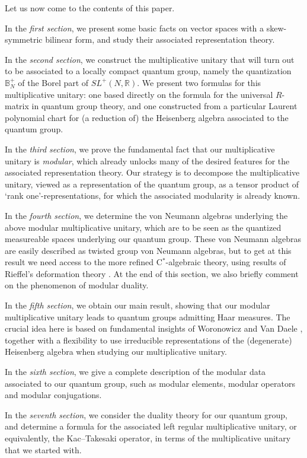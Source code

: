 \documentclass[11pt, reqno]{amsart}
\theoremstyle{definition}
\numberwithin{equation}{section}
\def\R{\mathbb R}
\newcommand{\Bbbb}{\mathbb{B}}
\begin{document}
Let us now come to the contents of this paper. 

In the \emph{first section}, we present some basic facts on vector spaces with a skew-symmetric bilinear form, and study their associated representation theory. 

In the \emph{second section}, we construct the multiplicative unitary that will turn out to be associated to a locally compact quantum group, namely the quantization $\Bbbb_N^+$ of the Borel part of $SL^+(N,\R)$. We present two formulas for this multiplicative unitary: one based directly on the formula for the universal $R$-matrix in quantum group theory, and one constructed from a particular Laurent polynomial chart for (a reduction of) the Heisenberg algebra associated to the quantum group. 

In the \emph{third section}, we prove the fundamental fact that our multiplicative unitary is \emph{modular}, which already unlocks many of the desired features for the associated representation theory. Our strategy is to decompose the multiplicative unitary, viewed as a representation of the quantum group, as a tensor product of `rank one'-representations, for which the associated modularity is already known. 

In the \emph{fourth section}, we determine the von Neumann algebras underlying the above modular multiplicative unitary, which are to be seen as the quantized measureable spaces underlying our quantum group. These von Neumann algebras are easily described as twisted group von Neumann algebras, but to get at this result we need access to the more refined C$^*$-algebraic theory, using results of Rieffel's deformation theory \cite{Rie93}. At the end of this section, we also briefly comment on the phenomenon of modular duality. 

In the \emph{fifth section}, we obtain our main result, showing that our modular multiplicative unitary leads to quantum groups admitting Haar measures. The crucial idea here is based on fundamental insights of Woronowicz and Van Daele \cite{VD01,Wor03}, together with a flexibility to use irreducible representations of the (degenerate) Heisenberg algebra when studying our multiplicative unitary. 

In the \emph{sixth section}, we give a complete description of the modular data associated to our quantum group, such as modular elements, modular operators and modular conjugations. 

In the \emph{seventh section}, we consider the duality theory for our quantum group, and determine a formula for the associated left regular multiplicative unitary, or equivalently, the Kac--Takesaki operator, in terms of the multiplicative unitary that we started with. 
\end{document}

